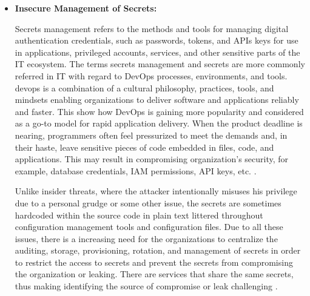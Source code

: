 \begin{itemize}
    \item \textbf{Insecure Management of Secrets:} \par Secrets management refers to the methods and tools for managing digital authentication credentials, such as passwords, tokens, and APIs keys for use in applications, privileged accounts, services, and other sensitive parts of the IT ecosystem.
    The terms secrets management and secrets are more commonly referred in IT with regard to DevOps processes, environments, and tools.
    \gls{devops} is a combination of a cultural philosophy,
    practices, tools, and mindsets enabling organizations to deliver software and applications reliably and faster.
    This show how DevOps is gaining more popularity and considered as a go-to model for rapid application delivery.
    When the product deadline is nearing, programmers
    often feel pressurized to meet the demands and, in
    their haste, leave sensitive pieces of code embedded
    in files, code, and applications.
    This may result in compromising organization’s
    security, for example, database credentials, IAM permissions, API keys, etc. \cite{70}.

    Unlike insider threats, where the attacker intentionally misuses his privilege due to a personal grudge or some
    other issue, the secrets are sometimes hardcoded
    within the source code in plain text littered throughout configuration management tools and configuration files.
    Due to all these issues, there is a increasing  need
    for the organizations to centralize the auditing,
    storage, provisioning, rotation, and management of
    secrets in order to restrict the access to secrets
    and prevent the secrets from compromising the organization or leaking.
    There are services that share the same secrets, thus making identifying the source of compromise or leak challenging \cite{70}.
\end{itemize}

